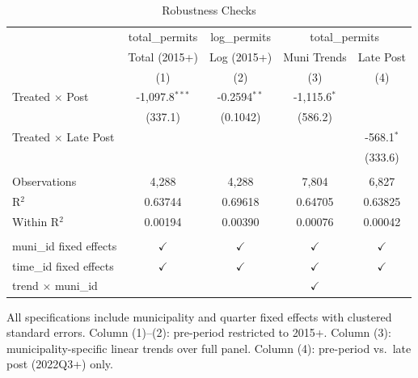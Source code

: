 
\begin{table}[htbp]
   \caption{\label{tab:robust} Robustness Checks}
   \bigskip
   \centering
   \begin{tabular}{lcccc}
      \toprule
       & total\_permits & log\_permits & \multicolumn{2}{c}{total\_permits}\\
                                  & Total (2015+)    & Log (2015+)    & Muni Trends    & Late Post \\   
                                  & (1)              & (2)            & (3)            & (4)\\  
      \midrule 
      Treated $\times$ Post       & -1,097.8$^{***}$ & -0.2594$^{**}$ & -1,115.6$^{*}$ &   \\   
                                  & (337.1)          & (0.1042)       & (586.2)        &   \\   
      Treated $\times$ Late Post  &                  &                &                & -568.1$^{*}$\\   
                                  &                  &                &                & (333.6)\\   
       \\
      Observations                & 4,288            & 4,288          & 7,804          & 6,827\\  
      R$^2$                       & 0.63744          & 0.69618        & 0.64705        & 0.63825\\  
      Within R$^2$                & 0.00194          & 0.00390        & 0.00076        & 0.00042\\  
       \\
      muni\_id fixed effects      & $\checkmark$     & $\checkmark$   & $\checkmark$   & $\checkmark$\\   
      time\_id fixed effects      & $\checkmark$     & $\checkmark$   & $\checkmark$   & $\checkmark$\\   
      trend $\times $ muni\_id    &                  &                & $\checkmark$   & \\  
      \bottomrule
   \end{tabular}
   
   \par \raggedright 
   All specifications include municipality and quarter fixed effects with clustered standard errors. Column (1)--(2): pre-period restricted to 2015+. Column (3): municipality-specific linear trends over full panel. Column (4): pre-period vs.\ late post (2022Q3+) only.
\end{table}


